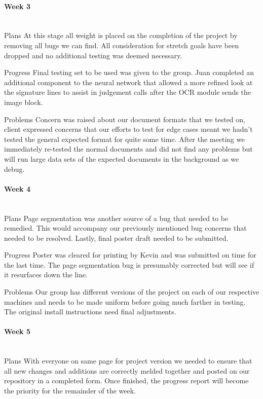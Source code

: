 \documentclass[article, onecolumn, draftclsnofoot,10pt, compsoc]{IEEEtran}
\begin{document}
\paragraph{Week 3}
\mbox{}\\
Plans
At this stage all weight is placed on the completion of the project by removing all bugs we can find. All consideration for stretch goals have been dropped and no additional testing was deemed necessary.
 
Progress
Final testing set to be used was given to the group. Juan completed an additional component to the neural network that allowed a more refined look at the signature lines to assist in judgement calls after the OCR module sends the image block. 
 
Problems
Concern was raised about our document formats that we tested on, client expressed concerns that our efforts to test for edge cases meant we hadn't tested the general expected format for quite some time. After the meeting we immediately re-tested the normal documents and did not find any problems but will run large data sets of the expected documents in the background as we debug.

\paragraph{Week 4}
\mbox{}\\
Plans
Page segmentation was another source of a bug that needed to be remedied. This would accompany our previously mentioned bug concerns that needed to be resolved. Lastly, final poster draft needed to be submitted.
 
Progress
Poster was cleared for printing by Kevin and was submitted on time for the last time. The page segmentation bug is presumably corrected but will see if it resurfaces down the line.
 
Problems
Our group has different versions of the project on each of our respective machines and needs to be made uniform before going much farther in testing. The original install instructions need final adjustments.

\paragraph{Week 5}
\mbox{}\\
Plans
With everyone on same page for project version we needed to ensure that all new changes and additions are correctly melded together and posted on our repository in a completed form. Once finished, the progress report will become the priority for the remainder of the week.
 
\end{document}
